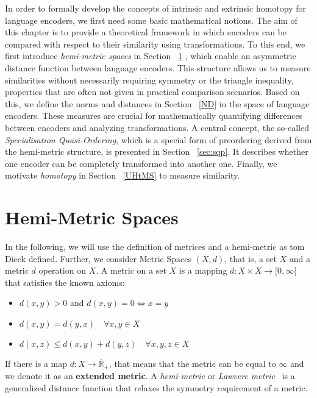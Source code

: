 In order to formally develop the concepts of intrinsic and extrinsic homotopy for language encoders, we first need some basic mathematical notions.
The aim of this chapter is to provide a theoretical framework in which encoders can be compared with respect to their similarity using transformations. 
To this end, we first introduce \emph{hemi-metric spaces} in Section ~\ref{HMS} , which enable an asymmetric distance function between language encoders.
This structure allows us to measure similarities without necessarily requiring symmetry or the triangle inequality, properties that are often not given in practical comparison scenarios.
Based on this, we define the norms and distances in Section ~\ref{ND} in the space of language encoders.
These measures are crucial for mathematically quantifying differences between encoders and analyzing transformations. %
A central concept, the so-called \emph{Specialisation Quasi-Ordering}, which is a special form of preordering derived from the hemi-metric structure, is presented in Section ~\ref{sec:sqp}.
It describes whether one encoder can be completely transformed into another one.
Finally, we motivate \emph{homotopy} in Section ~\ref{UHtMS} to measure similarity.


\section{Hemi-Metric Spaces}\label{HMS}
In the following, we will use the definition of metrices and a hemi-metric as tom Dieck \cite{dieck_mengentheoretische_top} defined.
Further, we consider Metric Spaces $(X,d)$, that is, a set $X$ and a metric $d$ operation on $X$.
A metric on a set $X$ is a mapping $d:X\times X \rightarrow [0,\infty[$ that satisfies the known axioms:
\begin{itemize}
    \item [M1] $d(x,y) > 0$ and $d(x,y) = 0 \Leftrightarrow x=y$
    \item [M2] $d(x,y)=d(y,x) \quad \forall x,y\in X$
    \item [M3] $d(x,z) \leq d(x,y) + d(y,z) \quad \forall x,y,z \in X$
\end{itemize}

If there is a map $d:X\rightarrow \overline{\mathbb{R}}_+$, that means that the metric can be equal to $\infty$ and we denote it as an \textbf{extended metric}.
A \emph{hemi-metric} or \emph{Lawvere metric}~\cite{lawvere_metric_1973} is a generalized distance function that relaxes the symmetry requirement of a metric.

